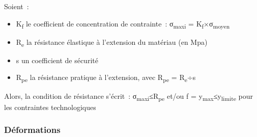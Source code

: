 Soient~:

\begin{itemize}
\item
  K\textsubscript{f} le coefficient de concentration de contrainte~: σ\textsubscript{maxi} = K\textsubscript{f}×σ\textsubscript{moyen}
\item
  R\textsubscript{e} la résistance élastique à l'extension du matériau (en Mpa)
\item
  s un coefficient de sécurité
\item
  R\textsubscript{pe} la résistance pratique à l'extension, avec R\textsubscript{pe} = R\textsubscript{e}÷s
\end{itemize}

Alors, la condition de résistance s'écrit~: σ\textsubscript{maxi}≤R\textsubscript{pe} et/ou f = y\textsubscript{max}≤y\textsubscript{limite} pour les contraintes technologiques

\hypertarget{duxe9formations}{%
\subsubsection{Déformations}\label{duxe9formations}}

